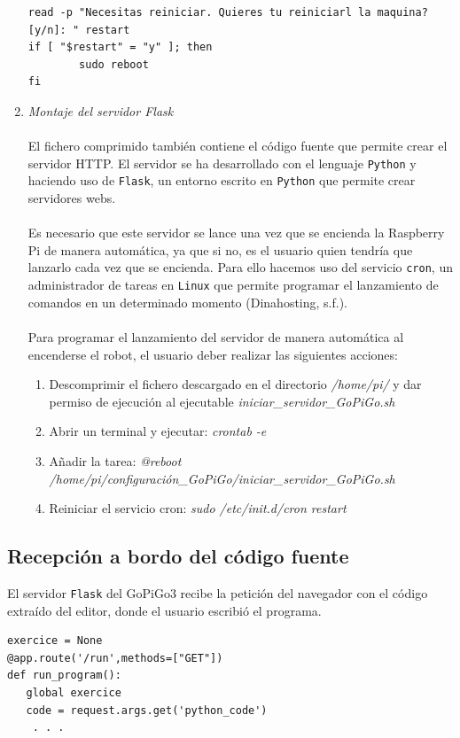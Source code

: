 \begin{enumerate}
\begin{lstlisting}[frame=single,breaklines=true, label=Ejecutable para la instalación y configuración de la Raspberry Pi, caption=Ejecutable para la instalación y configuración de la Raspberry Pi,  captionpos=b]
read -p "Necesitas reiniciar. Quieres tu reiniciarl la maquina? [y/n]: " restart
if [ "$restart" = "y" ]; then
        sudo reboot
fi
	\end{lstlisting}
	\item \textit{Montaje del servidor Flask}
	\\
	\\
	El fichero comprimido también contiene el código fuente que permite crear el servidor HTTP. El servidor se ha desarrollado con el lenguaje \texttt {Python} y haciendo uso de \texttt{Flask}, un entorno escrito en \texttt{Python} que permite crear servidores webs.
	\\
	\\
	Es necesario que este servidor se lance una vez que se encienda la Raspberry Pi de manera automática, ya que si no, es el usuario quien tendría que lanzarlo cada vez que se encienda. Para ello hacemos uso del servicio \texttt{cron}, un administrador de tareas en \texttt{Linux} que permite programar el lanzamiento de comandos en un determinado momento (Dinahosting, s.f.).
	\\
	\\
	Para programar el lanzamiento del servidor de manera automática al encenderse el robot, el usuario deber realizar las siguientes acciones:
	\begin{enumerate}
		\item Descomprimir el fichero descargado en el directorio \textit{/home/pi/} y dar permiso de ejecución al ejecutable \textit{iniciar\_servidor\_GoPiGo.sh}
		\item Abrir un terminal y ejecutar:  \textit{crontab -e}
		\item Añadir la tarea: \textit{@reboot /home/pi/configuración\_GoPiGo/iniciar\_servidor\_GoPiGo.sh}
		\item Reiniciar el servicio cron: \textit{sudo /etc/init.d/cron restart}
	\end{enumerate}
\end{enumerate}

\subsection{Recepción a bordo del código fuente}

El servidor \texttt{Flask} del GoPiGo3 recibe la petición del navegador con el código extraído del editor, donde el usuario escribió el programa.
\\
\begin{lstlisting}[frame=single,breaklines=true, label=Extracción del código en el servidor del GoPiGo3, caption=Extracción del código en el servidor del GoPiGo3,  captionpos=b]
exercice = None
@app.route('/run',methods=["GET"])
def run_program():
   global exercice
   code = request.args.get('python_code')
    . . .
\end{lstlisting}


